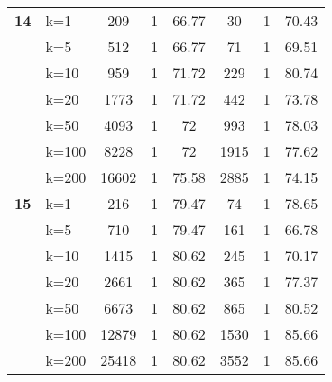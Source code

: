 \begin{table}[htbp]
\begin{tabular}{|l|l|c|c|c|c|c|c|}
    \multicolumn{1}{|r|}{\textbf{14}} & k=1 & 209 & 1 & 66.77 & 30 & 1 & 70.43 \\ 
     & k=5 & 512 & 1 & 66.77 & 71 & 1 & 69.51 \\ 
     & k=10 & 959 & 1 & 71.72 & 229 & 1 & 80.74 \\ 
     & k=20 & 1773 & 1 & 71.72 & 442 & 1 & 73.78 \\ 
     & k=50 & 4093 & 1 & 72 & 993 & 1 & 78.03 \\ 
     & k=100 & 8228 & 1 & 72 & 1915 & 1 & 77.62 \\ 
     & k=200 & 16602 & 1 & 75.58 & 2885 & 1 & 74.15 \\ \hline
    \multicolumn{1}{|r|}{\textbf{15}} & k=1 & 216 & 1 & 79.47 & 74 & 1 & 78.65 \\ 
     & k=5 & 710 & 1 & 79.47 & 161 & 1 & 66.78 \\ 
     & k=10 & 1415 & 1 & 80.62 & 245 & 1 & 70.17 \\ 
     & k=20 & 2661 & 1 & 80.62 & 365 & 1 & 77.37 \\ 
     & k=50 & 6673 & 1 & 80.62 & 865 & 1 & 80.52 \\ 
     & k=100 & 12879 & 1 & 80.62 & 1530 & 1 & 85.66 \\ 
     & k=200 & 25418 & 1 & 80.62 & 3552 & 1 & 85.66 \\ \hline
    \end{tabular}
\end{table}
